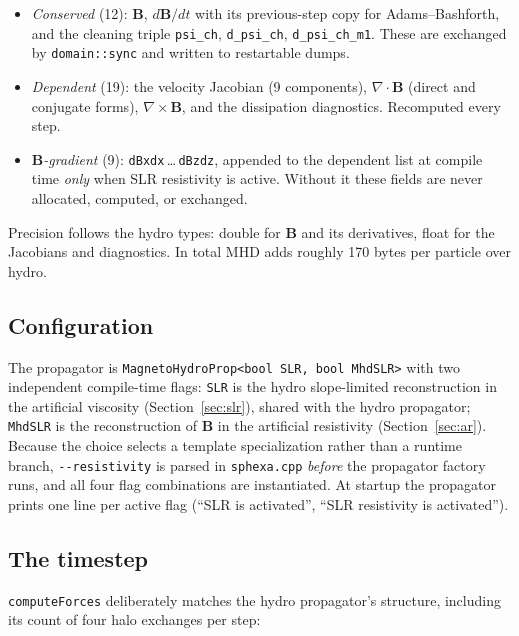 \begin{itemize}
    \item \emph{Conserved} (12): $\mathbf{B}$, $d\mathbf{B}/dt$ with its previous-step copy for Adams--Bashforth, and the cleaning triple \texttt{psi\_ch}, \texttt{d\_psi\_ch}, \texttt{d\_psi\_ch\_m1}. These are exchanged by \texttt{domain::sync} and written to restartable dumps.
    \item \emph{Dependent} (19): the velocity Jacobian (9 components), $\nabla\cdot\mathbf{B}$ (direct and conjugate forms), $\nabla\times\mathbf{B}$, and the dissipation diagnostics. Recomputed every step.
    \item \emph{$\mathbf{B}$-gradient} (9): \texttt{dBxdx}\,\dots\,\texttt{dBzdz}, appended to the dependent list at compile time \emph{only} when SLR resistivity is active. Without it these fields are never allocated, computed, or exchanged.
\end{itemize}

Precision follows the hydro types: double for $\mathbf{B}$ and its derivatives, float for the Jacobians and diagnostics. In total MHD adds roughly 170 bytes per particle over hydro.

\subsection{Configuration}

The propagator is \texttt{MagnetoHydroProp<bool SLR, bool MhdSLR>} with two independent compile-time flags: \texttt{SLR} is the hydro slope-limited reconstruction in the artificial viscosity (Section~\ref{sec:slr}), shared with the hydro propagator; \texttt{MhdSLR} is the reconstruction of $\mathbf{B}$ in the artificial resistivity (Section~\ref{sec:ar}). Because the choice selects a template specialization rather than a runtime branch, \texttt{-{}-resistivity} is parsed in \texttt{sphexa.cpp} \emph{before} the propagator factory runs, and all four flag combinations are instantiated. At startup the propagator prints one line per active flag (``SLR is activated'', ``SLR resistivity is activated'').

\subsection{The timestep}

\texttt{computeForces} deliberately matches the hydro propagator's structure, including its count of four halo exchanges per step:

